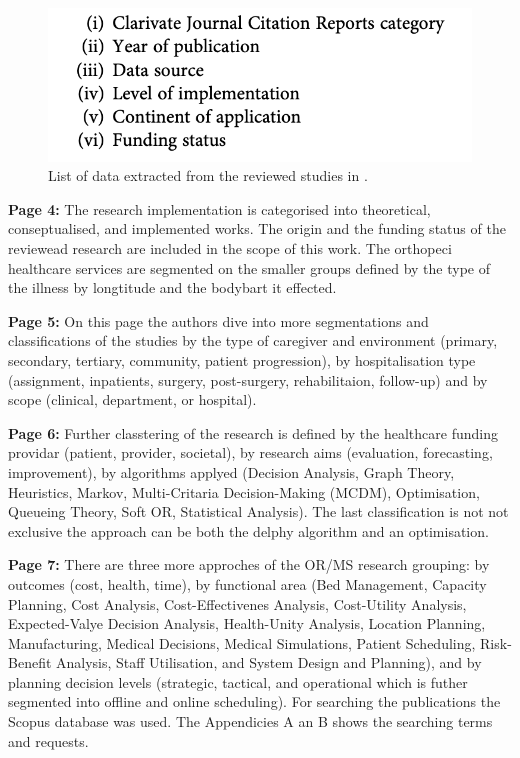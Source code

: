     \begin{figure}[H]
        \centering
        \includegraphics[width=.8\textwidth]{figures/SR0005GB23/fig1.png}
        \caption{List of data extracted from the reviewed studies in \cite{x122}.}
        \label{fig1:SR0005GB23}
    \end{figure}
    
    \textbf{Page 4:}
    The research implementation is categorised into theoretical, conseptualised, and implemented works. The origin and the funding status of the reviewead research are included in the scope of this work. The orthopeci healthcare services are segmented on the smaller groups defined by the type of the illness by longtitude and the bodybart it effected.
    
    \textbf{Page 5:}
    On this page the authors dive into more segmentations and classifications of the studies by the type of caregiver and environment (primary, secondary, tertiary, community, patient progression), by hospitalisation type (assignment, inpatients, surgery, post-surgery, rehabilitaion, follow-up) and by scope (clinical, department, or hospital). 
   
    \textbf{Page 6:}
    Further classtering of the research is defined by the healthcare funding providar (patient, provider, societal), by research aims (evaluation, forecasting, improvement), by algorithms applyed (Decision Analysis, Graph Theory, Heuristics, Markov, Multi-Critaria Decision-Making (MCDM), Optimisation, Queueing Theory, Soft OR, Statistical Analysis). The last classification is not not exclusive the approach can be both the delphy algorithm and an optimisation.
    
    \textbf{Page 7:}
    There are three more approches of the OR/MS research grouping: by outcomes (cost, health, time), by functional area (Bed Management, Capacity Planning, Cost Analysis, Cost-Effectivenes Analysis, Cost-Utility Analysis, Expected-Valye Decision Analysis, Health-Unity Analysis, Location Planning, Manufacturing, Medical Decisions, Medical Simulations, Patient Scheduling, Risk-Benefit Analysis, Staff Utilisation, and System Design and Planning), and by planning decision levels (strategic, tactical, and operational which is futher segmented into offline and online scheduling). 
    For searching the publications the Scopus database was used. The Appendicies A an B shows the searching terms and requests.
    
